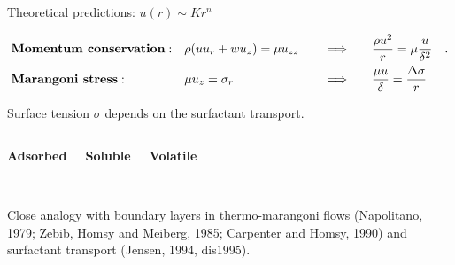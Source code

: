 \documentclass[compress,10pt,dvipsnames,svgnames,pdftex]{beamer}
\begin{document}
\begin{frame}{Theoretical predictions: $u(r) \sim K r^n$}

\begin{mdframed}[style=MyFrame]
{\scriptsize
\begin{align*}
&\text{\bf Momentum conservation}:&  &\rho(uu_r + w u_z) = \mu u_{zz}& &\quad \Longrightarrow \quad&  &\dfrac{\rho u^2}{r} = \mu \dfrac{u}{\delta^2}&. \\
&\text{\bf Marangoni stress}:&       &\mu u_z = \sigma_r&        &\quad \Longrightarrow \quad&  &\dfrac{\mu u}{\delta} = \dfrac{\Delta \sigma}{r}&
\end{align*}
\centerline{Surface tension $\sigma$ depends on the surfactant transport.}
}
\end{mdframed}


\begin{columns}
\column{3.5cm}
\begin{mdframed}[style=MyFrame]
{\scriptsize
\centerline{\bf Adsorbed}
}
\end{mdframed}

\column{3.5cm}
\begin{mdframed}[style=MyFrame]
{\scriptsize
\centerline{\bf Soluble}
}
\end{mdframed}

\column{3.5cm}
\begin{mdframed}[style=MyFrame]
{\scriptsize
\centerline{\bf Volatile}
}
\end{mdframed}
\end{columns}
~\\[1mm]
{\tiny Close analogy with boundary layers in thermo-marangoni flows (Napolitano, 1979; Zebib, Homsy and Meiberg, 1985; Carpenter and Homsy, 1990) and surfactant transport (Jensen, 1994, dis1995).}
\end{frame}
\end{document}
